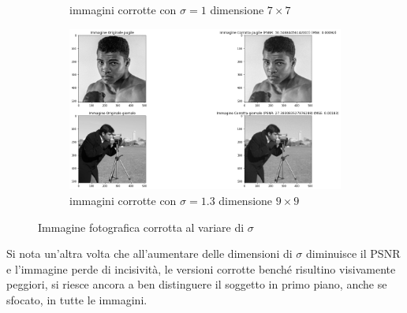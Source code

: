 \begin{figure}[H]
\begin{subfigure}{0.67\textwidth}
        \caption{immagini corrotte con $\sigma = 1$ dimensione $7 \times 7$}
        \label{fig: fotogrCorrotte7x7}
    \end{subfigure}
    \begin{subfigure}{0.67\textwidth}
        \centering
        \includegraphics[width=\textwidth]{confrontiPuntoUno/9-1.3-0.02.png}
        \caption{immagini corrotte con $\sigma = 1.3$ dimensione $9 \times 9$}
        \label{fig: fotogrCorrotte9x9}
    \end{subfigure}
    \caption{Immagine fotografica corrotta al variare di $\sigma$}
    \label{fig: fotogrCorrotte}
\end{figure}
Si nota un'altra volta che all'aumentare delle dimensioni di $\sigma$ diminuisce il PSNR e l'immagine perde di 
incisività, le versioni corrotte benché risultino visivamente peggiori, si riesce ancora a ben distinguere il 
soggetto in primo piano, anche se sfocato, in tutte le immagini. 
